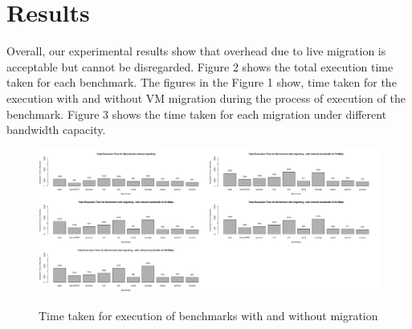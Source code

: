 \documentclass[a4paper,10pt,twoside]{article}
\begin{document}
\section{Results}
Overall, our experimental results show that overhead due to live migration is acceptable but cannot be disregarded. Figure 2 shows the total execution time taken for each benchmark. The figures in the Figure 1 show, time taken for the execution with and without VM migration during the process of execution of the benchmark. Figure 3 shows the time taken for each migration under different bandwidth capacity.
\begin{figure}[h]
\centering
\includegraphics[width=500px]{benchmark_acutal_migrationtime.png} \\ 
\caption{Time taken for execution of benchmarks with and without migration}
\end{figure}
\end{document}
